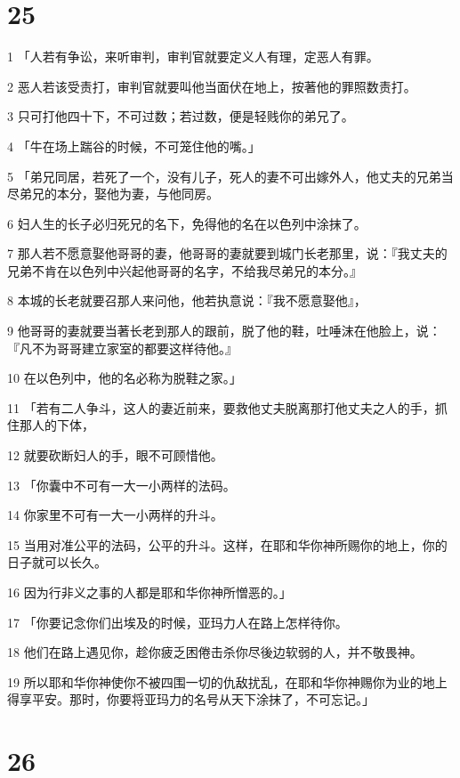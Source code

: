 \chapter{25}

\par 1 「人若有争讼，来听审判，审判官就要定义人有理，定恶人有罪。
\par 2 恶人若该受责打，审判官就要叫他当面伏在地上，按著他的罪照数责打。
\par 3 只可打他四十下，不可过数；若过数，便是轻贱你的弟兄了。
\par 4 「牛在场上踹谷的时候，不可笼住他的嘴。」
\par 5 「弟兄同居，若死了一个，没有儿子，死人的妻不可出嫁外人，他丈夫的兄弟当尽弟兄的本分，娶他为妻，与他同房。
\par 6 妇人生的长子必归死兄的名下，免得他的名在以色列中涂抹了。
\par 7 那人若不愿意娶他哥哥的妻，他哥哥的妻就要到城门长老那里，说：『我丈夫的兄弟不肯在以色列中兴起他哥哥的名字，不给我尽弟兄的本分。』
\par 8 本城的长老就要召那人来问他，他若执意说：『我不愿意娶他』，
\par 9 他哥哥的妻就要当著长老到那人的跟前，脱了他的鞋，吐唾沫在他脸上，说：『凡不为哥哥建立家室的都要这样待他。』
\par 10 在以色列中，他的名必称为脱鞋之家。」
\par 11 「若有二人争斗，这人的妻近前来，要救他丈夫脱离那打他丈夫之人的手，抓住那人的下体，
\par 12 就要砍断妇人的手，眼不可顾惜他。
\par 13 「你囊中不可有一大一小两样的法码。
\par 14 你家里不可有一大一小两样的升斗。
\par 15 当用对准公平的法码，公平的升斗。这样，在耶和华你神所赐你的地上，你的日子就可以长久。
\par 16 因为行非义之事的人都是耶和华你神所憎恶的。」
\par 17 「你要记念你们出埃及的时候，亚玛力人在路上怎样待你。
\par 18 他们在路上遇见你，趁你疲乏困倦击杀你尽後边软弱的人，并不敬畏神。
\par 19 所以耶和华你神使你不被四围一切的仇敌扰乱，在耶和华你神赐你为业的地上得享平安。那时，你要将亚玛力的名号从天下涂抹了，不可忘记。」

\chapter{26}

